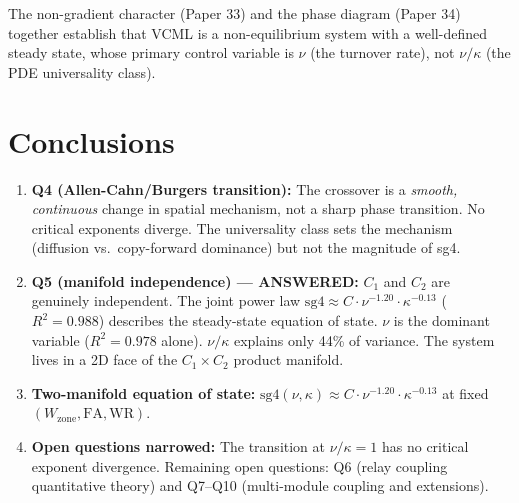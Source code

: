 \documentclass[11pt]{article}
\begin{document}
The non-gradient character (Paper 33) and the phase diagram (Paper 34) together establish
that VCML is a non-equilibrium system with a well-defined steady state, whose primary
control variable is $\nu$ (the turnover rate), not $\nu/\kappa$ (the PDE universality class).

\section{Conclusions}

\begin{enumerate}
\item \textbf{Q4 (Allen-Cahn/Burgers transition):} The crossover is a \emph{smooth,
  continuous} change in spatial mechanism, not a sharp phase transition. No critical
  exponents diverge. The universality class sets the mechanism (diffusion vs.\ copy-forward
  dominance) but not the magnitude of sg4.

\item \textbf{Q5 (manifold independence) --- ANSWERED:} $C_1$ and $C_2$ are genuinely
  independent. The joint power law $\mathrm{sg4} \approx C \cdot \nu^{-1.20} \cdot
  \kappa^{-0.13}$ ($R^2 = 0.988$) describes the steady-state equation of state. $\nu$
  is the dominant variable ($R^2 = 0.978$ alone). $\nu/\kappa$ explains only 44\% of
  variance. The system lives in a 2D face of the $C_1 \times C_2$ product manifold.

\item \textbf{Two-manifold equation of state:}
  $\mathrm{sg4}(\nu, \kappa) \approx C \cdot \nu^{-1.20} \cdot \kappa^{-0.13}$
  at fixed $(W_{\mathrm{zone}}, \mathrm{FA}, \mathrm{WR})$.

\item \textbf{Open questions narrowed:} The transition at $\nu/\kappa = 1$ has
  no critical exponent divergence. Remaining open questions: Q6 (relay coupling
  quantitative theory) and Q7--Q10 (multi-module coupling and extensions).
\end{enumerate}
\end{document}
